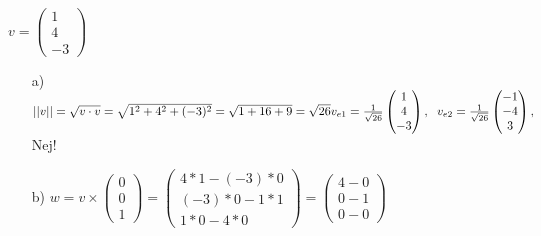 \subsection{}
\begin{math}
    v=
    \begin{pmatrix}
        1\\
        4\\
        -3
    \end{pmatrix}
\end{math}
\begin{enumerate}
    \item[a)]
        \begin{math}
            ||v||
            =\sqrt{v\cdot v}
            =\sqrt{1^2+4^2+(-3)^2}
            =\sqrt{1+16+9}
            =\sqrt{26}
            \\
            v_{e1}
            =\frac{1}{\sqrt{26}}\begin{pmatrix}
                1\\
                4\\
                -3
            \end{pmatrix},
            \hspace{6px}
            v_{e2}
            =\frac{1}{\sqrt{26}}\begin{pmatrix}
                -1\\
                -4\\
                3
            \end{pmatrix},
        \end{math}
        \hspace{6px}
		Nej!
    \item[b)]
    \begin{math}
        w
        =v\times \begin{pmatrix}
            0\\
            0\\
            1
        \end{pmatrix}
        =\begin{pmatrix}
            4*1-(-3)*0\\
            (-3)*0-1*1\\
            1*0-4*0
        \end{pmatrix}
        =\begin{pmatrix}
            4-0\\
            0-1\\
            0-0
        \end{pmatrix}

\end{math}
\end{enumerate}
